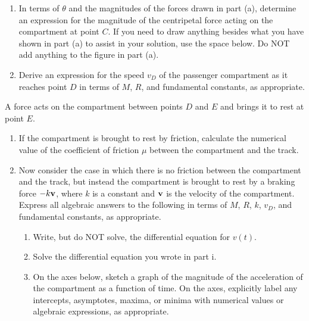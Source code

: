 \documentclass{../../../oss-apphys}
\begin{document}
\begin{enumerate}
\begin{enumerate}[leftmargin=15pt]
  \item In terms of $\theta$ and the magnitudes of the forces drawn in part
    (a), determine an expression for the magnitude of the centripetal force
    acting on the compartment at point $C$. If you need to draw anything
    besides what you have shown in part (a) to assist in your solution, use the
    space below. Do NOT add anything to the figure in part (a).
    \vspace{\stretch1}
    
  \item Derive an expression for the speed $v_D$ of the passenger compartment
    as it reaches point $D$ in terms of $M$, $R$, and fundamental constants, as
    appropriate.
    \vspace{\stretch1}
  \end{enumerate}
  \newpage
  A force acts on the compartment between points $D$ and $E$ and brings it to
  rest at point $E$.
  \begin{enumerate}[resume]
  \item If the compartment is brought to rest by friction, calculate the
    numerical value of the coefficient of friction $\mu$ between the
    compartment and the track.
    \vspace{1in}
  \item Now consider the case in which there is no friction between the
    compartment and the track, but instead the compartment is brought to rest
    by a braking force $-k\mathbf{v}$, where $k$ is a constant and $\mathbf{v}$ is the
    velocity of the compartment. Express all algebraic answers to the following
    in terms of $M$, $R$, $k$, $v_D$, and fundamental constants, as
    appropriate.
    \begin{enumerate}
    \item Write, but do NOT solve, the differential equation for $v(t)$.
      \vspace{\stretch1}
    \item Solve the differential equation you wrote in part i.
      \vspace{\stretch1}
    \item On the axes below, sketch a graph of the magnitude of the
      acceleration of the compartment as a function of time. On the axes,
      explicitly label any intercepts, asymptotes, maxima, or minima with
      numerical values or algebraic expressions, as appropriate.
      \begin{center}
      \end{center}
    \end{enumerate}
  \end{enumerate}
\end{enumerate}
\end{document}
